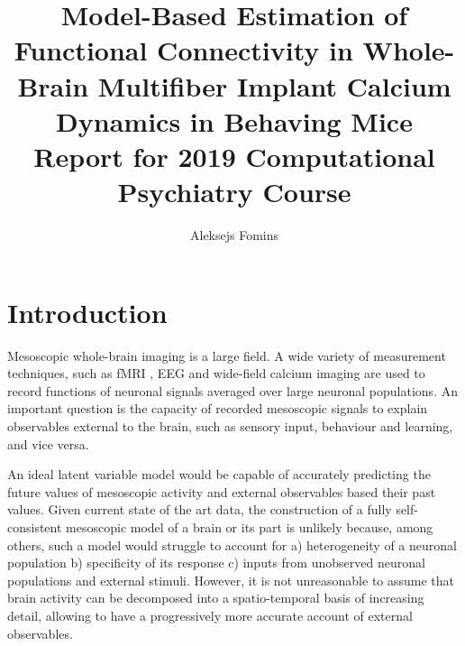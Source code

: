 \documentclass[a4paper,10pt]{article}
\title{
  Model-Based Estimation of Functional Connectivity in Whole-Brain Multifiber Implant Calcium Dynamics in Behaving Mice\\
  \vspace{10pt}
  \small Report for 2019 Computational Psychiatry Course}
\author{Aleksejs Fomins}
\begin{document}
\maketitle

\section{Introduction}
Mesoscopic whole-brain imaging is a large field. A wide variety of measurement techniques, such as fMRI \cite{ogawa_brain_1990, belliveau_functional_1990, deyoe_functional_1994, buxton_modeling_2004, kiebel_dynamic_2008}, EEG \cite{wright_dynamics_1996, baillet_bayesian_1997, gross_dynamic_2001, kececi_quantitative_2008} and wide-field calcium imaging \cite{gilad_behavioral_2018, silasi_intact_2016, holtmaat_long-term_2009, dombeck_imaging_2007} are used to record functions of neuronal signals averaged over large neuronal populations. An important question is the capacity of recorded mesoscopic signals to explain observables external to the brain, such as sensory input, behaviour and learning, and vice versa.

An ideal latent variable model would be capable of accurately predicting the future values of mesoscopic activity and external observables based their past values. Given current state of the art data, the construction of a fully self-consistent mesoscopic model of a brain or its part is unlikely because, among others, such a model would struggle to account for a) heterogeneity of a neuronal population b) specificity of its response c) inputs from unobserved neuronal populations and external stimuli. However, it is not unreasonable to assume that brain activity can be decomposed into a spatio-temporal basis of increasing detail, allowing to have a progressively more accurate account of external observables.
\end{document}
